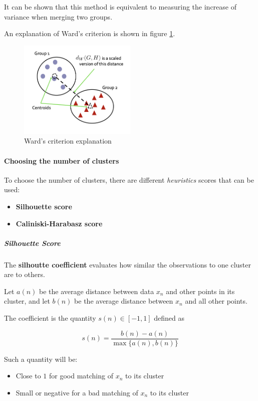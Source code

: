 It can be shown that this method is equivalent to measuring the increase of variance when merging two groups.

An explanation of Ward's criterion is shown in figure \ref{fig:wardcriterion}.
\begin{figure}[h]
    \centering
    \includegraphics[width=0.5\textwidth]{./figures/chapter_7/wardcriterion.png}
    \caption{Ward's criterion explanation}
    \label{fig:wardcriterion}
\end{figure}

\paragraph*{Choosing the number of clusters}
To choose the number of clusters, there are different \textit{heuristics} scores that can be used:
\begin{itemize}
    \item \textbf{Silhouette score}
    \item \textbf{Caliniski-Harabasz score}
\end{itemize}

\subparagraph*{Silhouette Score}
The \textbf{silhoutte coefficient} evaluates how similar the observations to one cluster are to others.

Let $a(n)$ be the average distance between data $x_n$ and other points in its cluster, and let $b(n)$ be the average distance between $x_n$ and all other points.

The coefficient is the quantity $s(n)\in[-1,1]$ defined as

\[
    s(n)=\frac{b(n)-a(n)}{\max\{a(n),b(n)\}}
\]

Such a quantity will be:
\begin{itemize}
    \item Close to $1$ for good matching of $x_n$ to its cluster
    \item Small or negative for a bad matching of $x_n$ to its cluster
\end{itemize}


